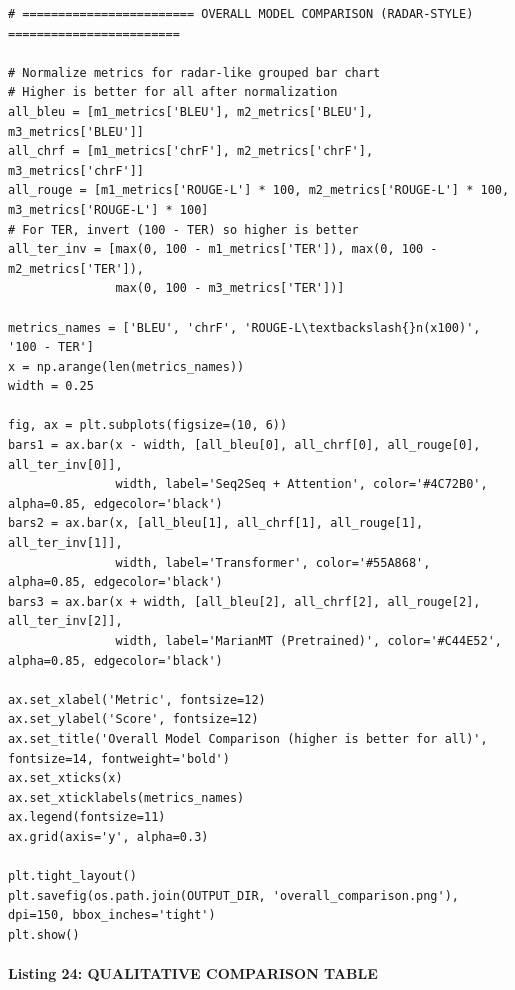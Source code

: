 \documentclass[12pt,a4paper,oneside]{report}
\begin{document}
\begin{Verbatim}[commandchars=\\\{\},breaklines=true,breakanywhere=true,fontsize=\scriptsize,frame=leftline,framesep=2mm,rulecolor=\color{gray}]
# ======================== OVERALL MODEL COMPARISON (RADAR-STYLE) ========================

# Normalize metrics for radar-like grouped bar chart
# Higher is better for all after normalization
all_bleu = [m1_metrics['BLEU'], m2_metrics['BLEU'], m3_metrics['BLEU']]
all_chrf = [m1_metrics['chrF'], m2_metrics['chrF'], m3_metrics['chrF']]
all_rouge = [m1_metrics['ROUGE-L'] * 100, m2_metrics['ROUGE-L'] * 100, m3_metrics['ROUGE-L'] * 100]
# For TER, invert (100 - TER) so higher is better
all_ter_inv = [max(0, 100 - m1_metrics['TER']), max(0, 100 - m2_metrics['TER']),
               max(0, 100 - m3_metrics['TER'])]

metrics_names = ['BLEU', 'chrF', 'ROUGE-L\textbackslash{}n(x100)', '100 - TER']
x = np.arange(len(metrics_names))
width = 0.25

fig, ax = plt.subplots(figsize=(10, 6))
bars1 = ax.bar(x - width, [all_bleu[0], all_chrf[0], all_rouge[0], all_ter_inv[0]],
               width, label='Seq2Seq + Attention', color='#4C72B0', alpha=0.85, edgecolor='black')
bars2 = ax.bar(x, [all_bleu[1], all_chrf[1], all_rouge[1], all_ter_inv[1]],
               width, label='Transformer', color='#55A868', alpha=0.85, edgecolor='black')
bars3 = ax.bar(x + width, [all_bleu[2], all_chrf[2], all_rouge[2], all_ter_inv[2]],
               width, label='MarianMT (Pretrained)', color='#C44E52', alpha=0.85, edgecolor='black')

ax.set_xlabel('Metric', fontsize=12)
ax.set_ylabel('Score', fontsize=12)
ax.set_title('Overall Model Comparison (higher is better for all)', fontsize=14, fontweight='bold')
ax.set_xticks(x)
ax.set_xticklabels(metrics_names)
ax.legend(fontsize=11)
ax.grid(axis='y', alpha=0.3)

plt.tight_layout()
plt.savefig(os.path.join(OUTPUT_DIR, 'overall_comparison.png'), dpi=150, bbox_inches='tight')
plt.show()
\end{Verbatim}
\paragraph{Listing 24: QUALITATIVE COMPARISON TABLE}\mbox{}\\[-1ex]
\end{document}
